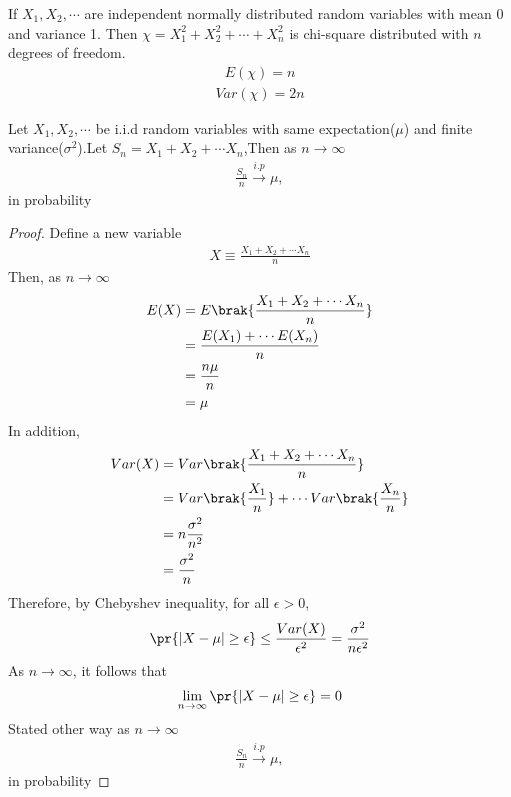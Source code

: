 \begin{theorem}
    If $X_1,X_2,\cdots$ are independent normally distributed random variables with mean 0 and variance 1. Then $\chi=X_{1}^2+X_{2}^2+\cdots+X_{n}^2$ is chi-square distributed with $n$ degrees of freedom.
    \begin{align}
        E(\chi)=n \label{conv/6/eq:x2}
    \end{align}
    \begin{align}
        Var(\chi)=2n\label{conv/6/eq:x10}
    \end{align}\label{conv/6/lem}
    \end{theorem}
    \begin{theorem}
    \label{conv/6/theorem}
    Let $X_1,X_2,\cdots $ be i.i.d random variables with same expectation($\mu$) and finite variance($\sigma^2$).Let $S_{n}=X_1+X_2+\cdots X_n$,Then as $n \to \infty$
    \begin{align}
        \frac{S_n}{n} \xrightarrow{i.p}  \mu,
    \end{align}
    in probability
    \end{theorem}
    \begin{proof}
    Define a new variable
    \begin{align}
        X \equiv \frac{X_1+X_2+\cdots X_n}{n}
    \end{align}
    Then, as $n \to \infty$
    \begin{align}
        E(X)&=E\brak{\frac{X_1+X_2+\cdots X_n}{n}}\\
        &=\frac{E(X_1)+\cdots E(X_n)}{n}\\
        &=\frac{n \mu}{n}\\
        &=\mu
    \end{align}
    In addition,
    \begin{align}
        Var(X)&=Var\brak{\frac{X_1+X_2+\cdots X_n}{n}}\\
        &=Var\brak{\frac{X_1}{n}}+\cdots Var{\brak{\frac{X_n}{n}}}\\
        &=n\frac{\sigma^2}{n^2}\\
        &=\frac{\sigma^2}{n}
    \end{align}
    Therefore, by Chebyshev inequality, for all $\epsilon>0$,
    \begin{align}
       \pr{|X-\mu| \geq \epsilon} \leq \frac{Var(X)}{\epsilon^2}=\frac{\sigma^2}{n\epsilon^2}   
    \end{align}
    As $n \to \infty$, it follows that
    \begin{align}
        \lim_{n \to \infty} \pr{|X-\mu| \geq \epsilon}=0
    \end{align}
    Stated other way as $n \to \infty$
    \begin{align}
        \frac{S_n}{n} \xrightarrow{i.p}  \mu,
    \end{align}
    in probability 
    \end{proof}
